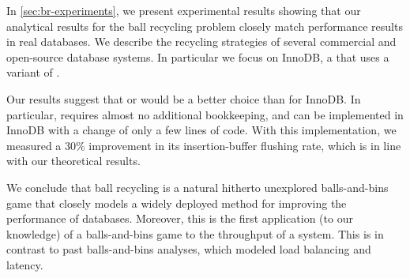 In \cref{sec:br-experiments}, we present experimental results showing that our
analytical results for the ball recycling problem closely match performance
results in real databases.  We describe the recycling strategies of several
commercial and open-source database systems. In particular we focus on InnoDB,
a \btree{} that uses a variant of \RB.

Our results suggest that \FB or \GG would be a better choice than \RB for
InnoDB. In particular, \GG requires almost no additional bookkeeping, and can
be implemented in InnoDB with a change of only a few lines of code.
With this implementation, we measured a 30\% improvement in its
insertion-buffer flushing rate, which is in line with our theoretical results.

We conclude that ball recycling is a natural hitherto unexplored balls-and-bins
game that closely models a widely deployed method for improving the performance
of databases. Moreover, this is the first application (to our knowledge) of a
balls-and-bins game to the throughput of a system. This is in contrast to past
balls-and-bins analyses, which modeled load balancing and latency.


